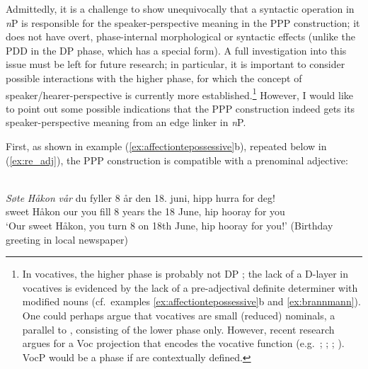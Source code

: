 \documentclass[output=paper]{langsci/langscibook}
\begin{document}
\noindent Admittedly, it is a challenge to show unequivocally that a syntactic
operation in \emph{n}P is  responsible for the speaker-perspective meaning in the PPP construction;  it does not have overt,
phase-internal morphological or syntactic effects (unlike the
\gls{PDD} in the DP
phase, which has a special form).  A full investigation into this
issue must be left for future research; in particular, it is important to
consider possible interactions with the higher phase, for which the concept of
speaker/hearer-perspective is currently more established.\footnote{In
    vocatives, the higher phase is probably not DP
    \citep{Longobardi1994}; the lack of a D-layer in  vocatives
    is evidenced by the lack of a pre-adjectival definite determiner with
    modified nouns (cf.\ examples \ref{ex:affectiontepossessive}b and
    \ref{ex:brannmann}).  One could perhaps  argue that vocatives are small
    (reduced) nominals, a parallel to 
    \citep{Pereltsvaig2006}, consisting of the lower phase only.
    However, recent research argues for a Voc projection that encodes the
    vocative function (e.g.\ \citealt{hill2007vocatives, hill2013vocatives};
    \citealt{espinal2013vocatives}; \citealt{stavrou2013aboutthevocative};
\citealt{julien2014vokativar, julien2016predicationalvocatives}). VocP would be
a phase if  are contextually defined. } However, I would
like to point out some  possible indications that the PPP construction indeed
gets its speaker-perspective meaning from an edge linker in  \emph{n}P.

First, as shown in example (\ref{ex:affectiontepossessive}b), repeated below in
(\ref{ex:re_adj}), the PPP construction is compatible with a prenominal
adjective:

\ea\label{ex:re_adj} \\
	\gll \textit{S\o{}te } \textit{H\aa{}kon} \textit{v\aa{}r} du fyller 8 \aa{}r den 18. juni, hipp hurra for deg!\\
	sweet H\aa{}kon our you fill 8 years the 18 June, hip hooray for you\\
	\glt `Our sweet H\aa{}kon, you turn 8 on  18th  June, hip hooray for you!' (Birthday greeting in local newspaper)
\z
\end{document}
